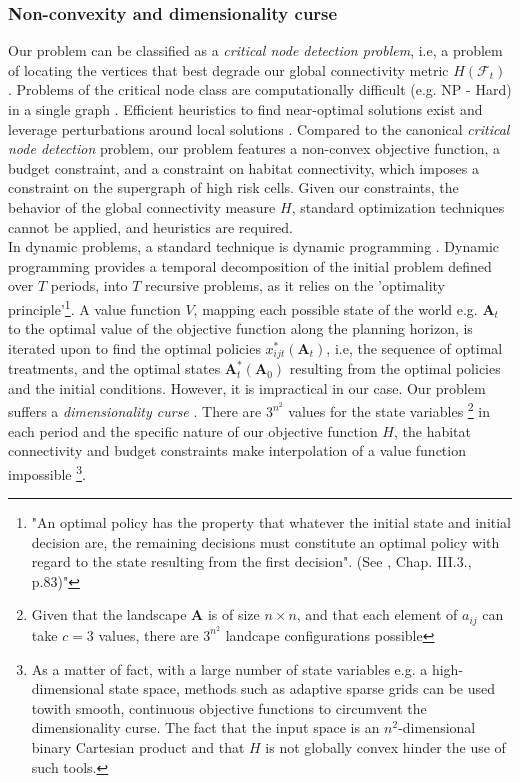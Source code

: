 \subsubsection{Non-convexity and dimensionality curse}
Our problem can be classified as a \textit{critical node detection problem}, i.e, a problem of locating the vertices that best degrade our global connectivity metric $H(\mathcal{F}_t)$ \citep{ARULSELVAN20092193}. Problems of the critical node class are computationally difficult (e.g. NP - Hard) in a single graph \citep{ARULSELVAN20092193, matsypura_wildfire_2018}. Efficient heuristics to find near-optimal solutions exist and leverage perturbations around local solutions \citep{ARULSELVAN20092193, Zhou2017}. Compared to the canonical \textit{critical node detection} problem, our problem features a non-convex objective function, a budget constraint, and a constraint on habitat connectivity, which imposes a constraint on the supergraph of high risk cells. Given our constraints, the behavior of the global connectivity measure $H$, standard optimization techniques cannot be applied, and heuristics are required. \\
In dynamic problems, a standard technique is dynamic programming \citep{Bellman}. Dynamic programming provides a temporal decomposition of the initial problem defined over $T$ periods, into $T$ recursive problems, as it relies on the 'optimality principle'\footnote{"An optimal policy has the property that whatever the initial state and initial decision are, the remaining decisions must constitute an optimal policy with regard to the state resulting from the first decision". (See \cite{Bellman}, Chap. III.3., p.83)"}. A value function $V$, mapping each possible state of the world e.g. $\mathbf{A}_t$ to the optimal value of the objective function along the planning horizon, is iterated upon to find the optimal policies $x_{ijt}^*(\mathbf{A}_t)$, i.e, the sequence of optimal treatments, and the optimal states $\mathbf{A}_t^*(\mathbf{A}_0)$ resulting from the optimal policies and the initial conditions.
However, it is impractical in our case. Our problem suffers a \textit{dimensionality curse} \citep{Bellman}. There are $3^{n^2}$ values for the state variables \footnote{Given that the landscape $\mathbf{A}$ is of size $n\times n$, and that each element of $a_{ij}$ can take $c=3$ values, there are $3^{n^2}$ landcape configurations possible} in each period and the specific nature of our objective function $H$, the habitat connectivity and budget constraints make interpolation of a value function impossible \footnote{As a matter of fact, with a large number of state variables e.g. a high-dimensional state space, methods such as adaptive sparse grids can be used towith smooth, continuous objective functions \citep{brumm_adaptive_2017} to circumvent the dimensionality curse. The fact that the input space is an $n^2$-dimensional binary Cartesian product and that $H$ is not globally convex hinder the use of such tools.}.
